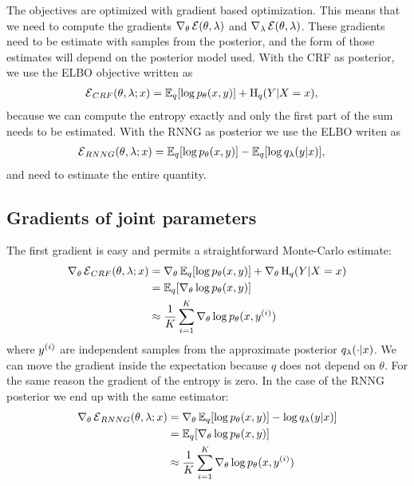   The objectives are optimized with gradient based optimization. This means that we need to compute the gradients $\nabla_{\theta} \operatorname{\mathcal{E}}(\theta, \lambda)$ and $\nabla_{\lambda} \operatorname{\mathcal{E}}(\theta, \lambda)$. These gradients need to be estimate with samples from the posterior, and the form of those estimates will depend on the posterior model used. With the CRF as posterior, we use the ELBO objective written as
  \begin{align}
    \operatorname{\mathcal{E}}_{CRF}(\theta, \lambda; x)
      &= \operatorname{\mathbb{E}}_q [ \log p_{\theta}( x, y ) ] + \operatorname{H}_q(Y | X = x),
  \end{align}
  because we can compute the entropy exactly and only the first part of the sum needs to be estimated. With the RNNG as posterior we use the ELBO writen as
  \begin{align}
    \operatorname{\mathcal{E}}_{RNNG}(\theta, \lambda; x)
      &= \operatorname{\mathbb{E}}_q [ \log p_{\theta}( x, y ) ] - \operatorname{\mathbb{E}}_q [ \log q_{\lambda}(y | x) ],
  \end{align}
  and need to estimate the entire quantity.

  \subsection{Gradients of joint parameters}
    The first gradient is easy and permits a straightforward Monte-Carlo estimate:
    \begin{align}
      \nabla_{\theta} \operatorname{\mathcal{E}}_{CRF}(\theta, \lambda; x)
        &= \nabla_{\theta} \operatorname{\mathbb{E}}_q [ \log p_{\theta}(x, y) ]  + \nabla_{\theta} \operatorname{H}_q( Y | X = x)  \nonumber \\
        &= \operatorname{\mathbb{E}}_q [ \nabla_{\theta} \log p_{\theta}(x, y) ]  \nonumber \\
        &\approx \frac{1}{K}\sum_{i=1}^K  \nabla_{\theta} \log p_{\theta}(x, y^{(i)})
    \end{align}
    where $y^{(i)}$ are independent samples from the approximate posterior $q_{\lambda}( \cdot | x)$. We can move the gradient inside the expectation because $q$ does not depend on $\theta$. For the same reason the gradient of the entropy is zero. In the case of the RNNG posterior we end up with the same estimator:
    \begin{align}
      \nabla_{\theta} \operatorname{\mathcal{E}}_{RNNG}(\theta, \lambda; x)
        &= \nabla_{\theta} \operatorname{\mathbb{E}}_q [ \log p_{\theta}(x, y) ]  - \log q_{\lambda}(y | x) ]  \nonumber \\
        &= \operatorname{\mathbb{E}}_q [ \nabla_{\theta} \log p_{\theta}(x, y) ]  \nonumber \\
        &\approx \frac{1}{K}\sum_{i=1}^K  \nabla_{\theta} \log p_{\theta}(x, y^{(i)})
    \end{align}

